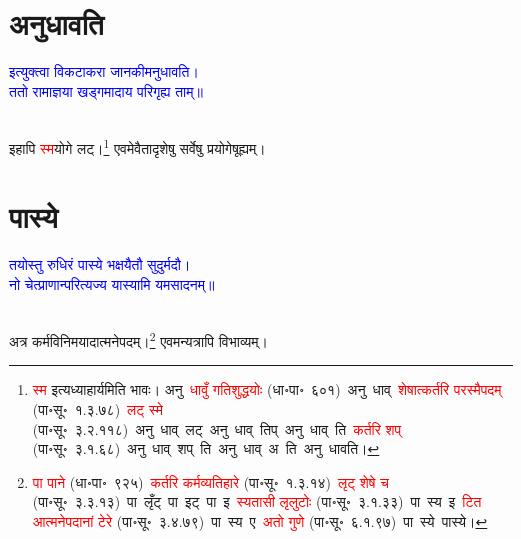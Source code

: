 \section[अनुधावति]{अनुधावति}
\centering\textcolor{blue}{इत्युक्त्वा विकटाकरा जानकीमनुधावति।\nopagebreak\\
ततो रामाज्ञया खड्गमादाय परिगृह्य ताम्॥}\nopagebreak\\
\\
\fontsize{14}{21}\selectfont\begin{sloppypar}\justifying\noindent\hspace{10mm} इहापि \textcolor{red}{स्म}\-योगे लट्।\footnote{\textcolor{red}{स्म} इत्यध्याहार्यमिति भावः। अनु~\textcolor{red}{धावुँ गतिशुद्धयोः} (धा॰पा॰~६०१)~\arrow अनु~धाव्~\arrow \textcolor{red}{शेषात्कर्तरि परस्मैपदम्} (पा॰सू॰~१.३.७८)~\arrow \textcolor{red}{लट् स्मे} (पा॰सू॰~३.२.११८)~\arrow अनु~धाव्~लट्~\arrow अनु~धाव्~तिप्~\arrow अनु~धाव्~ति~\arrow \textcolor{red}{कर्तरि शप्‌} (पा॰सू॰~३.१.६८)~\arrow अनु~धाव्~शप्~ति~\arrow अनु~धाव्~अ~ति~\arrow अनु~धावति।} एवमेवैतादृशेषु सर्वेषु प्रयोगेषूह्यम्।\end{sloppypar}
\section[पास्ये]{पास्ये}
\centering\textcolor{blue}{तयोस्तु रुधिरं पास्ये भक्षयैतौ सुदुर्मदौ।\nopagebreak\\
नो चेत्प्राणान्परित्यज्य यास्यामि यमसादनम्॥}\nopagebreak\\
\\
\fontsize{14}{21}\selectfont\begin{sloppypar}\justifying\noindent\hspace{10mm} अत्र कर्म\-विनिमयादात्मने\-पदम्।\footnote{\textcolor{red}{पा पाने} (धा॰पा॰~९२५)~\arrow \textcolor{red}{कर्तरि कर्म\-व्यतिहारे} (पा॰सू॰~१.३.१४)~\arrow \textcolor{red}{लृट् शेषे च} (पा॰सू॰~३.३.१३)~\arrow पा~लृँट्~\arrow पा~इट्~\arrow पा~इ~\arrow \textcolor{red}{स्यतासी लृलुटोः} (पा॰सू॰~३.१.३३)~\arrow पा~स्य~इ~\arrow \textcolor{red}{टित आत्मनेपदानां टेरे} (पा॰सू॰~३.४.७९)~\arrow पा~स्य~ए~\arrow \textcolor{red}{अतो गुणे} (पा॰सू॰~६.१.९७)~\arrow पा~स्ये~\arrow पास्ये।} एवमन्यत्रापि विभाव्यम्।\end{sloppypar}
